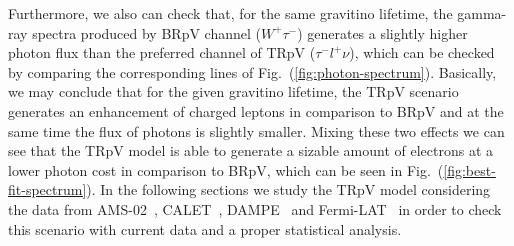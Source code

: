 \documentclass[a4paper,11pt]{article}
\begin{document}
Furthermore, we also can check that, for the same gravitino lifetime, the gamma-ray spectra produced by BRpV channel ($W^{+}\tau^{-}$) generates a slightly higher photon flux than the preferred channel of TRpV ($\tau^{-} l^{+}\nu$), which can be checked by comparing the corresponding lines of Fig.~(\ref{fig:photon-spectrum}). Basically, we may conclude that for the given gravitino lifetime, the TRpV scenario generates an enhancement of charged leptons in comparison to BRpV and at the same time the flux of photons is slightly smaller. Mixing these two effects we can see that the TRpV model is able to generate a sizable amount of electrons at a lower photon cost in comparison to BRpV, which can be seen in Fig.~(\ref{fig:best-fit-spectrum}). In the following sections we study the TRpV model considering the data from AMS-02~\cite{Accardo:2014lma,Aguilar:2014mma,Aguilar:2014fea}, CALET~\cite{Adriani:2018ktz}, DAMPE~\cite{Ambrosi:2017wek} and Fermi-LAT~\cite{Ackermann:2014usa} in order to check this scenario with current data and a proper statistical analysis. 
\end{document}
